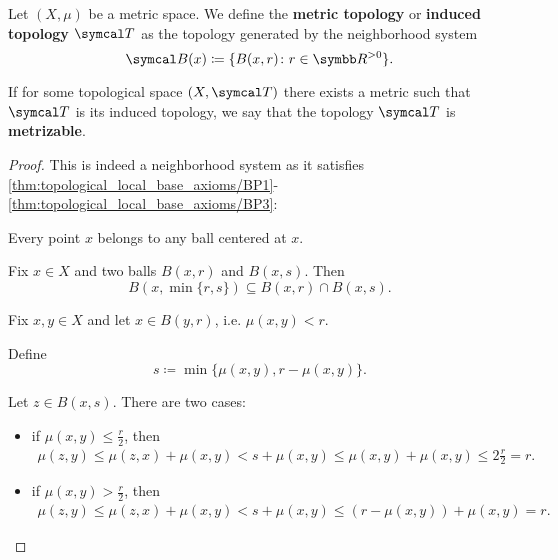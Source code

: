 \begin{definition}\label{def:metric_topology}\cite[249]{Engelking1989}
  Let \( (X, \mu) \) be a metric space. We define the \textbf{metric topology} or \textbf{induced topology} \( \Cal{T} \) as the topology generated by the neighborhood system
  \begin{equation*}
    \Cal{B}(x) \coloneqq \{ B (x, r) \colon r \in \R^{>0} \}.
  \end{equation*}

  If for some topological space \( (X, \Cal{T}) \) there exists a metric such that \( \Cal{T} \) is its induced topology, we say that the topology \( \Cal{T} \) is \textbf{metrizable}.
\end{definition}
\begin{proof}
  This is indeed a neighborhood system as it satisfies \ref{thm:topological_local_base_axioms/BP1}-\ref{thm:topological_local_base_axioms/BP3}:

  \begin{description}
     Every point \( x \) belongs to any ball centered at \( x \).

     Fix \( x \in X \) and two balls \( B(x, r) \) and \( B(x, s) \). Then
    \begin{equation*}
      B(x, \min\{ r, s \}) \subseteq B(x, r) \cap B(x, s).
    \end{equation*}

     Fix \( x, y \in X \) and let \( x \in B(y, r) \), i.e. \( \mu(x, y) < r \).

    Define
    \begin{equation*}
      s \coloneqq \min\{ \mu(x, y), r - \mu(x, y) \}.
    \end{equation*}

    Let \( z \in B(x, s) \). There are two cases:
    \begin{itemize}
      \item if \( \mu(x, y) \leq \tfrac r 2 \), then
      \begin{align*}
        \mu(z, y)
        \leq
        \mu(z, x) + \mu(x, y)
        <
        s + \mu(x, y)
        \leq
        \mu(x, y) + \mu(x, y)
        \leq
        2 \tfrac r 2
        =
        r.
      \end{align*}

      \item if \( \mu(x, y) > \tfrac r 2 \), then
      \begin{align*}
        \mu(z, y)
        \leq
        \mu(z, x) + \mu(x, y)
        <
        s + \mu(x, y)
        \leq
        (r - \mu(x, y)) + \mu(x, y)
        =
        r.
      \end{align*}
    \end{itemize}


\end{description}
\end{proof}

